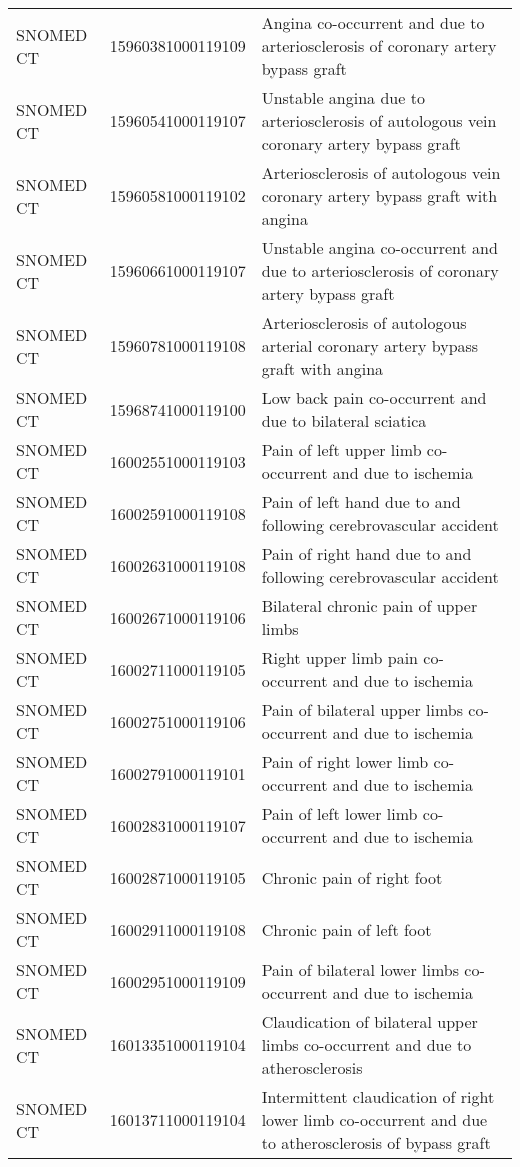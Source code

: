 \begin{longtable}{p{}p{}p{}}
  SNOMED CT & 15960381000119109 & Angina co-occurrent and due to arteriosclerosis of coronary artery bypass graft \\ 
  SNOMED CT & 15960541000119107 & Unstable angina due to arteriosclerosis of autologous vein coronary artery bypass graft \\ 
  SNOMED CT & 15960581000119102 & Arteriosclerosis of autologous vein coronary artery bypass graft with angina \\ 
  SNOMED CT & 15960661000119107 & Unstable angina co-occurrent and due to arteriosclerosis of coronary artery bypass graft \\ 
  SNOMED CT & 15960781000119108 & Arteriosclerosis of autologous arterial coronary artery bypass graft with angina \\ 
  SNOMED CT & 15968741000119100 & Low back pain co-occurrent and due to bilateral sciatica \\ 
  SNOMED CT & 16002551000119103 & Pain of left upper limb co-occurrent and due to ischemia \\ 
  SNOMED CT & 16002591000119108 & Pain of left hand due to and following cerebrovascular accident \\ 
  SNOMED CT & 16002631000119108 & Pain of right hand due to and following cerebrovascular accident \\ 
  SNOMED CT & 16002671000119106 & Bilateral chronic pain of upper limbs \\ 
  SNOMED CT & 16002711000119105 & Right upper limb pain co-occurrent and due to ischemia \\ 
  SNOMED CT & 16002751000119106 & Pain of bilateral upper limbs co-occurrent and due to ischemia \\ 
  SNOMED CT & 16002791000119101 & Pain of right lower limb co-occurrent and due to ischemia \\ 
  SNOMED CT & 16002831000119107 & Pain of left lower limb co-occurrent and due to ischemia \\ 
  SNOMED CT & 16002871000119105 & Chronic pain of right foot \\ 
  SNOMED CT & 16002911000119108 & Chronic pain of left foot \\ 
  SNOMED CT & 16002951000119109 & Pain of bilateral lower limbs co-occurrent and due to ischemia \\ 
  SNOMED CT & 16013351000119104 & Claudication of bilateral upper limbs co-occurrent and due to atherosclerosis \\ 
  SNOMED CT & 16013711000119104 & Intermittent claudication of right lower limb co-occurrent and due to atherosclerosis of bypass graft \\ 

\end{longtable}
